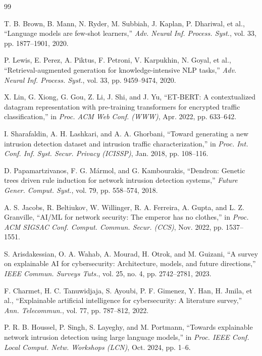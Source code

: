 \documentclass[11pt,letterpaper,onecolumn]{article}
\begin{document}
\begin{thebibliography}{99}
\fontsize{9.5}{11.5}\selectfont
\setlength{\itemsep}{0.5pt}\setlength{\parsep}{0pt}

T. B. Brown, B. Mann, N. Ryder, M. Subbiah, J. Kaplan, P. Dhariwal, et al., ``Language models are few-shot learners,'' \emph{Adv. Neural Inf. Process. Syst.}, vol. 33, pp. 1877--1901, 2020.

P. Lewis, E. Perez, A. Piktus, F. Petroni, V. Karpukhin, N. Goyal, et al., ``Retrieval-augmented generation for knowledge-intensive NLP tasks,'' \emph{Adv. Neural Inf. Process. Syst.}, vol. 33, pp. 9459--9474, 2020.

X. Lin, G. Xiong, G. Gou, Z. Li, J. Shi, and J. Yu, ``ET-BERT: A contextualized datagram representation with pre-training transformers for encrypted traffic classification,'' in \emph{Proc. ACM Web Conf. (WWW)}, Apr. 2022, pp. 633--642.

I. Sharafaldin, A. H. Lashkari, and A. A. Ghorbani, ``Toward generating a new intrusion detection dataset and intrusion traffic characterization,'' in \emph{Proc. Int. Conf. Inf. Syst. Secur. Privacy (ICISSP)}, Jan. 2018, pp. 108--116.

D. Papamartzivanos, F. G. M\'armol, and G. Kambourakis, ``Dendron: Genetic trees driven rule induction for network intrusion detection systems,'' \emph{Future Gener. Comput. Syst.}, vol. 79, pp. 558--574, 2018.

A. S. Jacobs, R. Beltiukov, W. Willinger, R. A. Ferreira, A. Gupta, and L. Z. Granville, ``AI/ML for network security: The emperor has no clothes,'' in \emph{Proc. ACM SIGSAC Conf. Comput. Commun. Secur. (CCS)}, Nov. 2022, pp. 1537--1551.

S. Arisdakessian, O. A. Wahab, A. Mourad, H. Otrok, and M. Guizani, ``A survey on explainable AI for cybersecurity: Architecture, models, and future directions,'' \emph{IEEE Commun. Surveys Tuts.}, vol. 25, no. 4, pp. 2742--2781, 2023.

F. Charmet, H. C. Tanuwidjaja, S. Ayoubi, P. F. Gimenez, Y. Han, H. Jmila, et al., ``Explainable artificial intelligence for cybersecurity: A literature survey,'' \emph{Ann. Telecommun.}, vol. 77, pp. 787--812, 2022.

P. R. B. Houssel, P. Singh, S. Layeghy, and M. Portmann, ``Towards explainable network intrusion detection using large language models,'' in \emph{Proc. IEEE Conf. Local Comput. Netw. Workshops (LCN)}, Oct. 2024, pp. 1--6.


\end{thebibliography}
\end{document}
